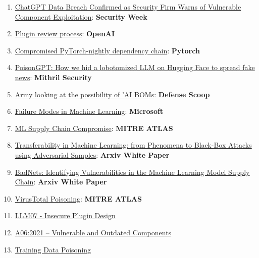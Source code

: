 \documentclass[
]{article}
\providecommand{\tightlist}{%
  \setlength{\itemsep}{0pt}\setlength{\parskip}{0pt}}
\begin{document}
\begin{enumerate}
\def\labelenumi{\arabic{enumi}.}
\tightlist
\item
  \href{https://www.securityweek.com/chatgpt-data-breach-confirmed-as-security-firm-warns-of-vulnerable-component-exploitation/}{ChatGPT
  Data Breach Confirmed as Security Firm Warns of Vulnerable Component
  Exploitation}: \textbf{Security Week}
\item
  \href{https://platform.openai.com/docs/plugins/review}{Plugin review
  process}: \textbf{OpenAI}
\item
  \href{https://pytorch.org/blog/compromised-nightly-dependency/}{Compromised
  PyTorch-nightly dependency chain}: \textbf{Pytorch}
\item
  \href{https://blog.mithrilsecurity.io/poisongpt-how-we-hid-a-lobotomized-llm-on-hugging-face-to-spread-fake-news/}{PoisonGPT:
  How we hid a lobotomized LLM on Hugging Face to spread fake news}:
  \textbf{Mithril Security}
\item
  \href{https://defensescoop.com/2023/05/25/army-looking-at-the-possibility-of-ai-boms-bill-of-materials/}{Army
  looking at the possibility of 'AI BOMs}: \textbf{Defense Scoop}
\item
  \href{https://learn.microsoft.com/en-us/security/engineering/failure-modes-in-machine-learning}{Failure
  Modes in Machine Learning}: \textbf{Microsoft}
\item
  \href{https://atlas.mitre.org/techniques/AML.T0010/}{ML Supply Chain
  Compromise}: \textbf{MITRE ATLAS}
\item
  \href{https://arxiv.org/pdf/1605.07277.pdf}{Transferability in Machine
  Learning: from Phenomena to Black-Box Attacks using Adversarial
  Samples}: \textbf{Arxiv White Paper}
\item
  \href{https://arxiv.org/abs/1708.06733}{BadNets: Identifying
  Vulnerabilities in the Machine Learning Model Supply Chain}:
  \textbf{Arxiv White Paper}
\item
  \href{https://atlas.mitre.org/studies/AML.CS0002}{VirusTotal
  Poisoning}: \textbf{MITRE ATLAS}
\item
  \href{InsecurePluginDesign.md}{LLM07 - Insecure Plugin Design}
\item
  \href{https://owasp.org/Top10/A06_2021-Vulnerable_and_Outdated_Components/}{A06:2021
  -- Vulnerable and Outdated Components}
\item
  \href{https://github.com/OWASP/www-project-top-10-for-large-language-model-applications/blob/main/1_0_vulns/Training_Data_Poisoning.md}{Training
  Data Poisoning}
\end{enumerate}
\end{document}
